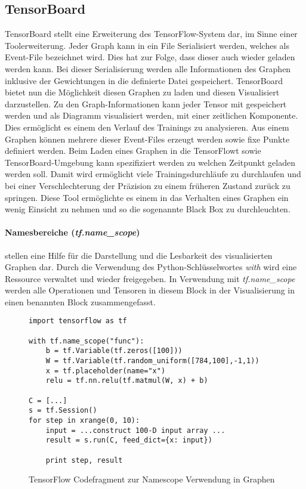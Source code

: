 \subsection{TensorBoard}

TensorBoard stellt eine Erweiterung des TensorFlow-System dar, im Sinne einer Toolerweiterung. 
Jeder Graph kann in ein File Serialisiert werden, welches als Event-File bezeichnet wird. 
Dies hat zur Folge, dass dieser auch wieder geladen werden kann. 
Bei dieser Serialisierung werden alle Informationen des Graphen inklusive der Gewichtungen in die definierte Datei gespeichert.
TensorBoard bietet nun die Möglichkeit diesen Graphen zu laden und diesen Visualisiert darzustellen.
Zu den Graph-Informationen kann jeder Tensor mit gespeichert werden und als Diagramm visualisiert werden, mit einer zeitlichen Komponente. 
Dies ermöglicht es einem den Verlauf des Trainings zu analysieren. 
Aus einem Graphen können mehrere dieser Event-Files erzeugt werden sowie fixe Punkte definiert werden. 
Beim Laden eines Graphen in die TensorFlowt sowie TensorBoard-Umgebung kann spezifiziert werden zu welchen Zeitpunkt geladen werden soll. 
Damit wird ermöglicht viele Trainingsdurchläufe zu durchlaufen und bei einer Verschlechterung der Präzision zu einem früheren Zustand zurück zu springen.
Diese Tool ermöglichte es einem in das Verhalten eines Graphen ein wenig Einsicht zu nehmen und so die sogenannte Black Box zu durchleuchten. 

\paragraph{Namesbereiche (\textit{tf.name\_scope})} stellen eine Hilfe für die Darstellung und die Lesbarkeit des visualisierten Graphen dar. 
Durch die Verwendung des Python-Schlüsselwortes \textit{with} wird eine Ressource verwaltet und wieder freigegeben. 
In Verwendung mit \textit{tf.name\_scope} werden alle Operationen und Tensoren in diesem Block in der Visualisierung in einen benannten Block zusammengefasst.

\begin{figure}

\lstset{language=Python}
\begin{lstlisting}
import tensorflow as tf

with tf.name_scope("func"):
	b = tf.Variable(tf.zeros([100])) 
	W = tf.Variable(tf.random_uniform([784,100],-1,1)) 
	x = tf.placeholder(name="x") 
	relu = tf.nn.relu(tf.matmul(W, x) + b) 

C = [...] 
s = tf.Session()
for step in xrange(0, 10):
	input = ...construct 100-D input array ... 
	result = s.run(C, feed_dict={x: input}) 

	print step, result 
\end{lstlisting}

	\caption{TensorFlow Codefragment zur Namescope Verwendung in Graphen}
	\label{fig:NameScopeFragmentGraphDefinition}
\end{figure}
\phantom \newline

